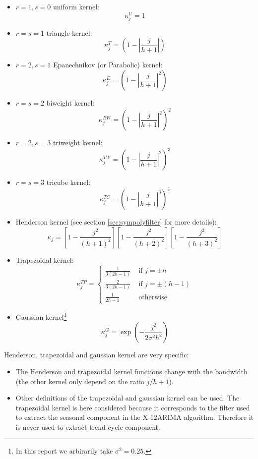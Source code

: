 \documentclass[
  12pt,
  ,
  a4paper]{article}
\newcommand\1{\mathds{1}}
\begin{document}
\begin{multicols}{2}
\begin{itemize}
\item $r=1,s=0$ uniform kernel: 
$$\kappa_j^U=1$$
\item $r=s=1$ triangle kernel:
$$\kappa_j^T=\left(
  1-
  \left\lvert
  \frac j {h+1}
  \right\lvert
\right)$$

\item $r=2,s=1$  Epanechnikov (or Parabolic) kernel:
$$\kappa_j^E=\left(
  1-
  \left\lvert
  \frac j {h+1}
  \right\lvert^2
\right)$$

\item $r=s=2$ biweight kernel:
$$\kappa_j^{BW}=\left(
  1-
  \left\lvert
  \frac j {h+1}
  \right\lvert^2
\right)^2$$

\item $r = 2, s = 3$ triweight kernel:
$$\kappa_j^{TW}=\left(
  1-
  \left\lvert
  \frac j {h+1}
  \right\lvert^2
\right)^3$$

\item $r = s = 3$ tricube kernel:
$$\kappa_j^{TC}=\left(
  1-
  \left\lvert
  \frac j {h+1}
  \right\lvert^3
\right)^3$$

\item Henderson kernel (see section \ref{sec:sympolyfilter} for more details):
$$
\kappa_{j}=\left[1-\frac{j^2}{(h+1)^2}\right]
\left[1-\frac{j^2}{(h+2)^2}\right]
\left[1-\frac{j^2}{(h+3)^2}\right]
$$
\item Trapezoidal kernel:
$$
\kappa_j^{TP}=
\begin{cases}
  \frac{1}{3(2h-1)} & \text{ if }j=\pm h 
  \\
  \frac{2}{3(2h-1)} & \text{ if }j=\pm (h-1)\\
  \frac{1}{2h-1}& \text{ otherwise}
\end{cases}
$$
\item Gaussian kernel\footnote{
In this report we arbirarily take $\sigma^2=0.25$.
}
$$
\kappa_j^G=\exp\left(
-\frac{
  j^2
}{
  2\sigma^2h^2
}\right)
$$
\end{itemize}
\end{multicols}

Henderson, trapezoidal and gaussian kernel are very specific:

\begin{itemize}
\item
  The Henderson and trapezoidal kernel functions change with the bandwidth (the other kernel only depend on the ratio \(j/h+1\)).
\item
  Other definitions of the trapezoidal and gaussian kernel can be used.
  The trapezoidal kernel is here considered because it corresponds to the filter used to extract the seasonal component in the X-12ARIMA algorithm.
  Therefore it is never used to extract trend-cycle component.
\end{itemize}
\end{document}
